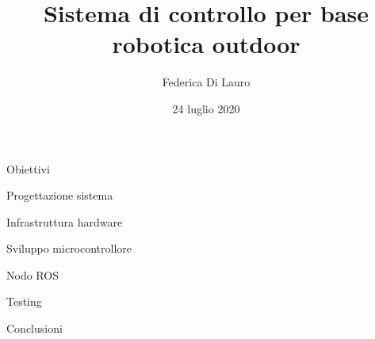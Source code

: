 \documentclass{beamer}
\author{Federica Di Lauro}
\title{Sistema di controllo per base robotica outdoor}
\date{24 luglio 2020}
\begin{document}
\titlepageframe %

\begin{tframe}{Obiettivi}

\end{tframe}

\begin{tframe}{Progettazione sistema}

\end{tframe}

\begin{tframe}{Infrastruttura hardware}

\end{tframe}

\begin{tframe}{Sviluppo microcontrollore}

\end{tframe}

\begin{tframe}{Nodo ROS}

\end{tframe}

\begin{tframe}{Testing}

\end{tframe}

\begin{tframe}{Conclusioni}

\end{tframe}
\end{document}
